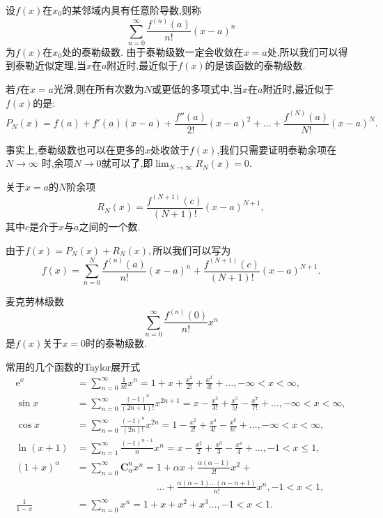 设$f(x)$在$x_0$的某邻域内具有任意阶导数,则称
    \begin{equation*}
        \sum^{\infty}_{n=0}\frac{f^{(n)}(a)}{n!}(x-a)^n
    \end{equation*}
为$f(x)$在$x_0$处的泰勒级数.
由于泰勒级数一定会收敛在$x=a$处,所以我们可以得到泰勒近似定理,当$x$在$a$附近时,最近似于$f(x)$的是该函数的泰勒级数.
    \begin{theorem}[泰勒近似定理]
        若$f$在$x=a$光滑,则在所有次数为$N$或更低的多项式中,当$x$在$a$附近时,最近似于$f(x)$的是:
            \begin{equation*}
                P_N(x)=f(a)+f'(a)(x-a)+\frac{f''(a)}{2!}(x-a)^2+\dots+\frac{f^{(N)}(a)}{N!}(x-a)^N.
            \end{equation*}
    \end{theorem}
事实上,泰勒级数也可以在更多的$x$处收敛于$f(x)$,我们只需要证明泰勒余项在$N \to \infty$ 时,余项$N \to 0$就可以了,即$\lim_{N \to \infty}R_N(x)=0.$
    \begin{theorem}[泰勒定理]
        关于$x=a$的$N$阶余项
            \begin{equation*}
                R_N(x)=\frac{f^{(N+1)}(c)}{(N+1)!}(x-a)^{N+1},
            \end{equation*}
        其中$c$是介于$x$与$a$之间的一个数.

        由于$f(x)=P_N(x)+R_N(x),$所以我们可以写为
            \begin{equation*}
                f(x)=\sum^{N}_{n=0}\frac{f^{(n)}(a)}{n!}(x-a)^n+\frac{f^{(N+1)}(c)}{(N+1)!}(x-a)^{N+1}.
            \end{equation*}
    \end{theorem}

麦克劳林级数
    \begin{equation*}
        \sum^{\infty}_{n=0}\frac{f^{(n)}(0)}{n!}x^n
    \end{equation*}
是$f(x)$关于$x=0$时的泰勒级数.

常用的几个函数的Taylor展开式
    \begin{align*}
        \mathrm{e}^x&=\sum^{\infty}_{n=0}\frac{1}{n!}x^n=1+x+\frac{x^2}{2!}+\frac{x^3}{3!}+\dots,-\infty<x<\infty,\\
        \sin x&=\sum^{\infty}_{n=0}\frac{(-1)^n}{(2n+1)!}x^{2n+1}=x-\frac{x^3}{3!}+\frac{x^5}{5!}-\frac{x^7}{7!}+\dots,-\infty<x<\infty,\\
        \cos x&=\sum^{\infty}_{n=0}\frac{(-1)^n}{(2n)!}x^{2n}=1-\frac{x^2}{2!}+\frac{x^4}{4!}-\frac{x^6}{6!}+\dots,-\infty<x<\infty,\\
        \ln(x+1)&=\sum^{\infty}_{n=1}\frac{(-1)^{n-1}}{n}x^n=x-\frac{x^2}{2}+\frac{x^3}{3}-\frac{x^4}{4}+\dots,-1<x\leqslant 1,\\
        (1+x)^\alpha&=\sum^{\infty}_{n=0}\mathbf{C} _\alpha^nx^n=1+\alpha x+\frac{\alpha(\alpha-1)}{2!}x^2+\\
        &\phantom{=\sum^{\infty}_{n=0}\mathbf{C} _\alpha^nx^n=}\dots+\frac{\alpha(\alpha-1)\dots(\alpha-n+1)}{n!}x^n,-1<x<1,\\
        \frac{1}{1-x}&=\sum^{\infty}_{n=0}x^n=1+x+x^2+x^3\dots,-1<x<1.
    \end{align*}

